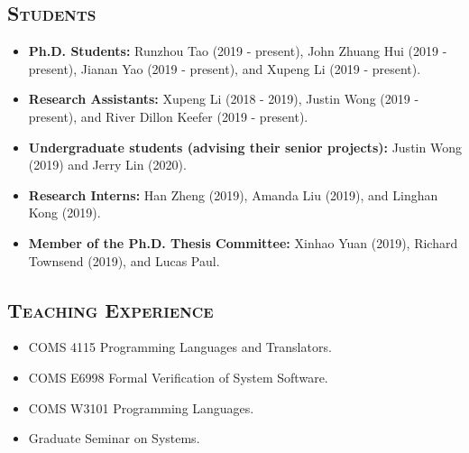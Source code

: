 \documentclass[10pt]{article}
\renewcommand{\section}[1]{
	\vspace{-5pt}
   	\subsection*{\scshape  \bfseries #1}
   }
\newenvironment{innerlist}[1][\enskip\textbullet]%
        {\begin{itemize}[#1,leftmargin=25pt,parsep=0pt,itemsep=2pt,topsep=2pt,partopsep=0pt]}
        {\end{itemize}}
\begin{document}
\section{Students}
\begin{innerlist}

\item[] \textbf{Ph.D. Students:} Runzhou Tao (2019 - present), John Zhuang Hui (2019 - present), Jianan Yao (2019 - present), and Xupeng Li (2019 - present).

\vspace{0.1in}


\item[] \textbf{Research Assistants:} Xupeng Li (2018 - 2019), Justin Wong (2019 - present), and River Dillon Keefer (2019 - present).



\vspace{0.1in}

\item[] \textbf{Undergraduate students (advising their senior projects):} 
Justin Wong (2019)
and Jerry Lin (2020).

\vspace{0.1in}

\item[] \textbf{Research Interns:}
Han Zheng (2019),
Amanda Liu (2019),
and Linghan Kong (2019).

\vspace{0.1in}

\item[] \textbf{Member of the Ph.D. Thesis Committee:} 
Xinhao Yuan (2019),
Richard Townsend (2019),
and Lucas Paul.

\end{innerlist}

\section{Teaching Experience}
\begin{innerlist}
\item[] COMS 4115 Programming Languages and Translators.
\vspace{0.05in}

\item[] COMS E6998 
Formal Verification of System Software.
\vspace{0.05in}

\item[] COMS W3101 
Programming Languages.
\vspace{0.05in}

\item[] Graduate Seminar on Systems.
\end{innerlist}
\end{document}
